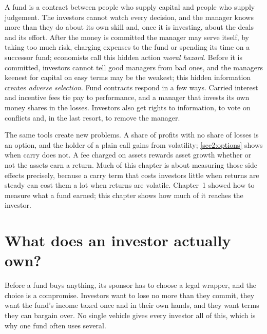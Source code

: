 \begin{chapterrefs}
A fund is a contract between people who supply capital and people who supply judgement. The investors
cannot watch every decision, and the manager knows more than they do about its own skill and, once it is
investing, about the deals and its effort. After the money is
committed the manager may serve itself, by taking too much risk, charging expenses to the fund or
spending its time on a successor fund; economists call this hidden action \emph{moral hazard}. Before
it is committed, investors cannot tell good managers from bad ones, and the managers keenest for
capital on easy terms may be the weakest; this hidden information creates \emph{adverse selection}. Fund contracts respond in a few ways. Carried
interest and incentive fees tie pay to performance, and a manager that invests its own money shares
in the losses. Investors also get rights to information, to vote on conflicts and, in the last
resort, to remove the manager.

The same tools create new problems. A share of profits with no share of losses is an option, and
the holder of a plain call gains from volatility; \cref{sec2:options} shows when carry does not. A fee charged on assets rewards asset growth whether or not the
assets earn a return. Much of this chapter is about measuring those side effects precisely, because a
carry term that costs investors little when returns are steady can cost them a lot when returns are
volatile. Chapter~1 showed how to measure what a
fund earned; this chapter shows how much of it reaches the investor.

\FloatBarrier
\section{What does an investor actually own?}
\label{sec2:vehicles}

Before a fund buys anything, its sponsor has to choose a legal wrapper, and the choice is a compromise.
Investors want to lose no more than they commit, they want the fund's income taxed once and in their
own hands, and they want terms they can bargain over. No single vehicle gives every investor all of
this, which is why one fund often uses several.


\end{chapterrefs}
